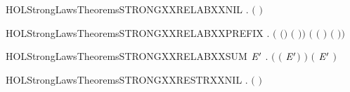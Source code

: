 \newcommand{\HOLStrongLawsTheoremsSTRONGXXRECXXACTTwo}{\UseVerbatim{HOLStrongLawsTheoremsSTRONGXXRECXXACTTwo}}
\begin{SaveVerbatim}{HOLStrongLawsTheoremsSTRONGXXRELABXXNIL}
\HOLTokenTurnstile{} \HOLSymConst{\HOLTokenForall{}}.  \ensuremath{(}  \ensuremath{)} 
\end{SaveVerbatim}
\newcommand{\HOLStrongLawsTheoremsSTRONGXXRELABXXNIL}{\UseVerbatim{HOLStrongLawsTheoremsSTRONGXXRELABXXNIL}}
\begin{SaveVerbatim}{HOLStrongLawsTheoremsSTRONGXXRELABXXPREFIX}
\HOLTokenTurnstile{} \HOLSymConst{\HOLTokenForall{}}  .
        \ensuremath{(} \ensuremath{(}\HOLSymConst{\ensuremath{\ldotp}}\ensuremath{)} \ensuremath{(} \ensuremath{)}\ensuremath{)}
         \ensuremath{(} \ensuremath{(} \ensuremath{)} \HOLSymConst{\ensuremath{\ldotp}}  \ensuremath{(} \ensuremath{)}\ensuremath{)}
\end{SaveVerbatim}
\newcommand{\HOLStrongLawsTheoremsSTRONGXXRELABXXPREFIX}{\UseVerbatim{HOLStrongLawsTheoremsSTRONGXXRELABXXPREFIX}}
\begin{SaveVerbatim}{HOLStrongLawsTheoremsSTRONGXXRELABXXSUM}
\HOLTokenTurnstile{} \HOLSymConst{\HOLTokenForall{}} \ensuremath{\HOLBoundVar{E}\sp{\prime}} .
        \ensuremath{(} \ensuremath{(} \HOLSymConst{\ensuremath{+}} \ensuremath{\HOLBoundVar{E}\sp{\prime}}\ensuremath{)} \ensuremath{)}
         \ensuremath{(}   \HOLSymConst{\ensuremath{+}}  \ensuremath{\HOLBoundVar{E}\sp{\prime}} \ensuremath{)}
\end{SaveVerbatim}
\newcommand{\HOLStrongLawsTheoremsSTRONGXXRELABXXSUM}{\UseVerbatim{HOLStrongLawsTheoremsSTRONGXXRELABXXSUM}}
\begin{SaveVerbatim}{HOLStrongLawsTheoremsSTRONGXXRESTRXXNIL}
\HOLTokenTurnstile{} \HOLSymConst{\HOLTokenForall{}}.  \ensuremath{(}  \ensuremath{)} 
\end{SaveVerbatim}
